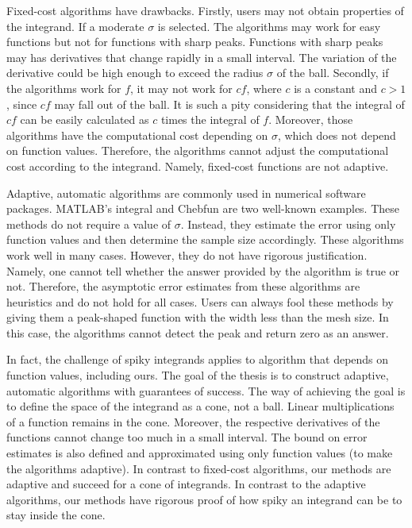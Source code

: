 \documentclass{iitthesis}
\theoremstyle{definition}
\theoremstyle{remark}
\begin{document}
Fixed-cost algorithms have drawbacks. Firstly, users may not obtain properties of the integrand. If a moderate $\sigma$ is selected. The algorithms may work for easy functions but not for functions with sharp peaks. Functions with sharp peaks may has derivatives that change rapidly in a small interval. The variation of the derivative could be high enough to exceed the radius $\sigma$ of the ball. Secondly, if the algorithms work for $f$, it may not work for $cf$, where $c$ is a constant and $c>1$, since $cf$ may fall out of the ball. It is such a pity considering that the integral of $cf$ can be easily calculated as $c$ times the integral of $f$. Moreover, those algorithms have the computational cost depending on $\sigma$, which does not depend on function values. Therefore, the algorithms cannot adjust the computational cost according to the integrand. Namely, fixed-cost functions are not adaptive.

\label{secada}

Adaptive, automatic algorithms are commonly used in numerical software packages. MATLAB's integral and Chebfun are two well-known examples. These methods do not require a value of $\sigma$. Instead, they estimate the error using only function values and then determine the sample size accordingly. These algorithms work well in many cases. However, they do not have rigorous justification. Namely, one cannot tell whether the answer provided by the algorithm is true or not. Therefore, the asymptotic error estimates from these algorithms are heuristics and do not hold for all cases. Users can always fool these methods by giving them a peak-shaped function with the width less than the mesh size. In this case, the algorithms cannot detect the peak and return zero as an answer.

In fact, the challenge of spiky integrands applies to algorithm that depends on function values, including ours. The goal of the thesis is to construct adaptive, automatic algorithms with guarantees of success. The way of achieving the goal is to define the space of the integrand as a cone, not a ball. Linear multiplications of a function remains in the cone. Moreover, the respective derivatives of the functions cannot change too much in a small interval. The bound on error estimates is also defined and approximated using only function values (to make the algorithms adaptive). In contrast to fixed-cost algorithms, our methods are adaptive and succeed for a cone of integrands. In contrast to the adaptive algorithms, our methods have rigorous proof of how spiky an integrand can be to stay inside the cone.
\end{document}
